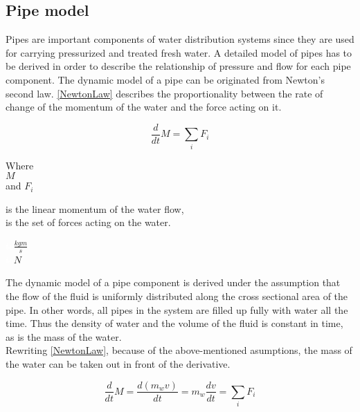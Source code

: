\subsection{Pipe model} 
\label{PipeModel}
Pipes are important components of water distribution systems since they are used for carrying pressurized and treated fresh water. A detailed model of pipes has to be derived in order to describe the relationship of pressure and flow for each pipe component.  
%
The dynamic model of a pipe can be originated from Newton's second law. \eqref{NewtonLaw} describes the proportionality between the rate of change of the momentum of the water and the force acting on it.

\begin{equation}
  \frac{d}{dt} M = \sum_i F_i
  \label{NewtonLaw}
\end{equation} 

\begin{minipage}[t]{0.20\textwidth}
Where\\
\hspace*{8mm} $M$ \\
and \hspace*{0.7mm}  $F_i$ 
\end{minipage}
\begin{minipage}[t]{0.68\textwidth}
\vspace*{2mm}
is the linear momentum of the water flow,\\
is the set of forces acting on the water.
\end{minipage}
\begin{minipage}[t]{0.10\textwidth}
\vspace*{2mm}
\textcolor{White}{te}$\unit{\frac{kgm}{s}}$\\
\textcolor{White}{te}$\unit{N}$
\end{minipage}

The dynamic model of a pipe component is derived under the assumption that the flow of the fluid is uniformly distributed along the cross sectional area of the pipe. In other words, all pipes in the system are filled up fully with water all the time. Thus the density of water and the volume of the fluid is constant in time, as is the mass of the water.
\\
Rewriting \eqref{NewtonLaw}, because of the above-mentioned asumptions, the mass of the water can be taken out in front of the derivative.

\begin{equation}
  \frac{d}{dt} M = {\frac{d(m_w v)}{dt}} = m_w \frac{dv}{dt} = \sum_i F_i
\end{equation} 

